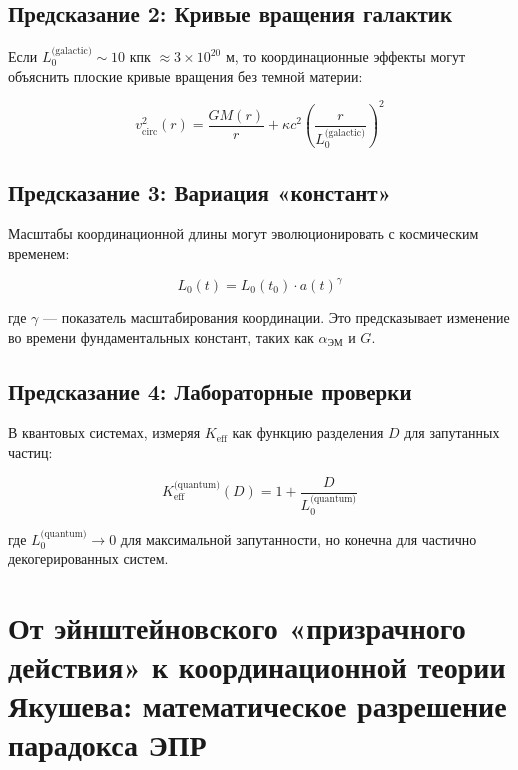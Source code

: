 \documentclass[11pt,a4paper]{article}
\begin{document}
	\subsection{Предсказание 2: Кривые вращения галактик}
	
	Если $L_0^{\text{(galactic)}} \sim 10$ кпк $\approx 3\times10^{20}$ м, то 
	координационные эффекты могут объяснить плоские кривые вращения без темной материи:
	
	\begin{equation}
		v_{\text{circ}}^2(r) = \frac{GM(r)}{r} + \kappa c^2 \left(\frac{r}{L_0^{\text{(galactic)}}}\right)^2
	\end{equation}
	
	\subsection{Предсказание 3: Вариация «констант»}
	
	Масштабы координационной длины могут эволюционировать с космическим временем:
	
	\begin{equation}
		L_0(t) = L_0(t_0) \cdot a(t)^\gamma
	\end{equation}
	
	где $\gamma$ — показатель масштабирования координации. Это предсказывает 
	изменение во времени фундаментальных констант, таких как $\alpha_{\text{ЭМ}}$ и $G$.
	
	\subsection{Предсказание 4: Лабораторные проверки}
	
	В квантовых системах, измеряя $K_{\mathrm{eff}}$ как функцию 
	разделения $D$ для запутанных частиц:
	
	\begin{equation}
		K_{\mathrm{eff}}^{\text{(quantum)}}(D) = 1 + \frac{D}{L_0^{\text{(quantum)}}}
	\end{equation}
	
	где $L_0^{\text{(quantum)}} \to 0$ для максимальной запутанности, но 
	конечна для частично декогерированных систем.
	
	\section{От эйнштейновского «призрачного действия» к координационной теории Якушева: математическое разрешение парадокса ЭПР}
	\label{sec:einstein-paradox}
	
\end{document}
